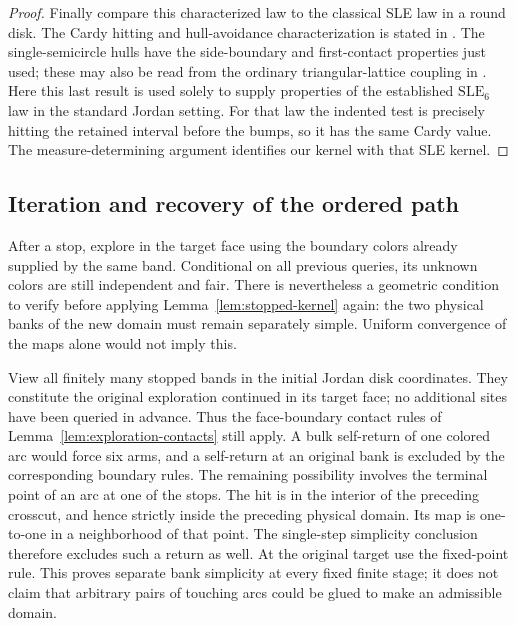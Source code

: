 \begin{proof}
Finally compare this characterized law to the classical SLE law in
a round disk.  The Cardy hitting and hull-avoidance characterization
is stated in \cite[Section~5, equations~(8)--(9), and
Lemma~5.1]{cnexploration}.  The single-semicircle hulls have the
side-boundary and first-contact properties just used; these may
also be read from the ordinary triangular-lattice coupling in
\cite[Lemmas~6.3--6.4 and Theorem~5]{cnexploration}.  Here this
last result is used solely to supply properties of the established
$\mathrm{SLE}_6$ law in the standard Jordan setting.  For that
law the indented test is precisely hitting the retained interval
before the bumps, so it has the same Cardy value.  The
measure-determining argument identifies our kernel with that SLE
kernel.
\end{proof}

\subsection{Iteration and recovery of the ordered path}

After a stop, explore in the target face using the boundary colors
already supplied by the same band.  Conditional on all previous
queries, its unknown colors are still independent and fair.  There
is nevertheless a geometric condition to verify before applying
Lemma~\ref{lem:stopped-kernel} again: the two physical banks of the
new domain must remain separately simple.  Uniform convergence of
the maps alone would not imply this.

View all finitely many stopped bands in the initial Jordan disk
coordinates.  They constitute the original exploration continued
in its target face; no additional sites have been queried in advance.
Thus the face-boundary contact rules of
Lemma~\ref{lem:exploration-contacts} still apply.  A bulk self-return
of one colored arc would force six arms, and a self-return at an
original bank is excluded by the corresponding boundary rules.
The remaining possibility involves the terminal point of an arc
at one of the stops.  The hit is in the interior of the preceding
crosscut, and hence strictly inside the preceding physical domain.
Its map is one-to-one in a neighborhood of that point.  The
single-step simplicity conclusion therefore excludes such a return
as well.  At the original target use the fixed-point rule.  This
proves separate bank simplicity at every fixed finite stage; it
does not claim that arbitrary pairs of touching arcs could be glued
to make an admissible domain.

